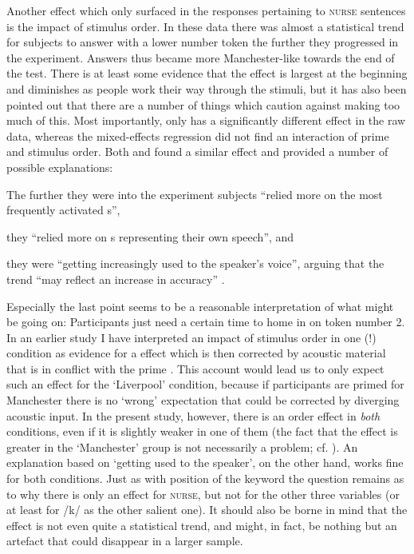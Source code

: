 Another effect which only surfaced in the responses pertaining to \textsc{nurse} sentences is the impact of stimulus order.
In these data there was almost a statistical trend for subjects to answer with a lower number token the further they progressed in the experiment.
Answers thus became more Manchester-like towards the end of the test.
There is at least some evidence that the  effect is largest at the beginning and diminishes as people work their way through the stimuli, but it has also been pointed out that there are a number of things which caution against making too much of this.
Most importantly,  only has a significantly different effect in the raw data, whereas the mixed-effects regression did not find an interaction of prime and stimulus order.
Both \textcite{hayetal2006a} and \textcite{haydrager2010} found a similar effect and provided a number of possible explanations:
	\begin{inparaenum}[(1)]
		\item The further they were into the experiment subjects ``relied more on the most frequently activated s'',
		\item they ``relied more on s representing their own speech'', and
		\item they were ``getting increasingly used to the speaker's voice'', arguing that the trend ``may reflect an increase in accuracy'' \parencite[881--882]{haydrager2010}.
	\end{inparaenum}

Especially the last point seems to be a reasonable interpretation of what might be going on: Participants just need a certain time to home in on token number 2.
In an earlier study I have interpreted an impact of stimulus order in one (!) condition as evidence for a  effect which is then corrected by acoustic material that is in conflict with the prime \parencite{juskanma}.
This account would lead us to only expect such an effect for the `Liverpool' condition, because if participants are primed for Manchester there is no `wrong' expectation that could be corrected by diverging acoustic input.
In the present study, however, there is an order effect in \emph{both} conditions, even if it is slightly weaker in one of them (the fact that the effect is greater in the `Manchester' group is not necessarily a problem; cf. ).
An explanation based on `getting used to the speaker', on the other hand, works fine for both conditions.
Just as with position of the keyword the question remains as to why there is only an effect for \textsc{nurse}, but not for the other three variables (or at least for /k/ as the other salient one).
It should also be borne in mind that the effect is not even quite a statistical trend, and might, in fact, be nothing but an artefact that could disappear in a larger sample.

